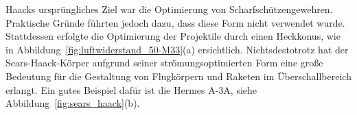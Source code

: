 Haacks ursprüngliches Ziel war die Optimierung von Scharfschützengewehren. 
%
Praktische Gründe führten jedoch dazu, dass diese 
Form nicht verwendet wurde. 
Stattdessen erfolgte die Optimierung der Projektile 
durch einen Heckkonus, wie in Abbildung~\ref{fig:luftwiderstand_50-M33}(a) ersichtlich.
Nichtsdestotrotz hat der Sears-Haack-Körper aufgrund 
seiner strömungsoptimierten Form eine große Bedeutung 
für die Gestaltung von Flugkörpern und Raketen
im Überschallbereich erlangt.
Ein gutes Beispiel dafür ist die Hermes A-3A, siehe Abbildung~\ref{fig:sears_haack}(b).
%
